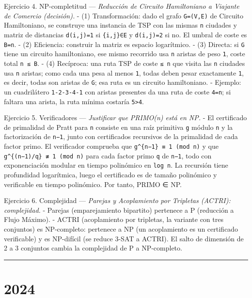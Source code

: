 \documentclass[12pt]{book} %
\begin{document}
Ejercicio 4. NP-completitud --- \emph{Reducción de Circuito Hamiltoniano
a Viajante de Comercio (decisión).} - (1) Transformación: dado el grafo
\texttt{G=(V,E)} de Circuito Hamiltoniano, se construye una instancia de
TSP con las mismas \texttt{n} ciudades y matriz de distancias
\texttt{d(i,j)=1} si \texttt{\{i,j\}∈E} y \texttt{d(i,j)=2} si no. El
umbral de coste es \texttt{B=n}. - (2) Eficiencia: construir la matriz
es espacio logarítmico. - (3) Directa: si \texttt{G} tiene un circuito
hamiltoniano, ese mismo recorrido usa \texttt{n} aristas de peso
\texttt{1}, coste total \texttt{n\ ≤\ B}. - (4) Recíproca: una ruta TSP
de coste \texttt{≤\ n} que visita las \texttt{n} ciudades usa \texttt{n}
aristas; como cada una pesa al menos \texttt{1}, todas deben pesar
exactamente \texttt{1}, es decir, todas son aristas de \texttt{G}; esa
ruta es un circuito hamiltoniano. - Ejemplo: un cuadrilátero
\texttt{1-2-3-4-1} con aristas presentes da una ruta de coste
\texttt{4=n}; si faltara una arista, la ruta mínima costaría
\texttt{5\textgreater{}4}.

Ejercicio 5. Verificadores --- \emph{Justificar que PRIMO(n) está en
NP.} - El certificado de primalidad de Pratt para \texttt{n} consiste en
una raíz primitiva \texttt{g} módulo \texttt{n} y la factorización de
\texttt{n−1}, junto con certificados recursivos de la primalidad de cada
factor primo. El verificador comprueba que
\texttt{g\^{}\{n−1\}\ ≡\ 1\ (mod\ n)} y que
\texttt{g\^{}\{(n−1)/q\}\ ≢\ 1\ (mod\ n)} para cada factor primo
\texttt{q} de \texttt{n−1}, todo con exponenciación modular en tiempo
polinómico en \texttt{log\ n}. La recursión tiene profundidad
logarítmica, luego el certificado es de tamaño polinómico y verificable
en tiempo polinómico. Por tanto, PRIMO ∈ NP.

Ejercicio 6. Complejidad --- \emph{Parejas y Acoplamiento por Tripletas
(ACTRI): complejidad.} - Parejas (emparejamiento bipartito) pertenece a
P (reducción a Flujo Máximo). - ACTRI (acoplamiento por tripletas, la
variante con tres conjuntos) es NP-completo: pertenece a NP (un
acoplamiento es un certificado verificable) y es NP-difícil (se reduce
3-SAT a ACTRI). El salto de dimensión de 2 a 3 conjuntos cambia la
complejidad de P a NP-completo.

\begin{center}\rule{0.5\linewidth}{0.5pt}\end{center}

\hypertarget{section-3}{%
\section{2024}\label{section-3}}
\end{document}
